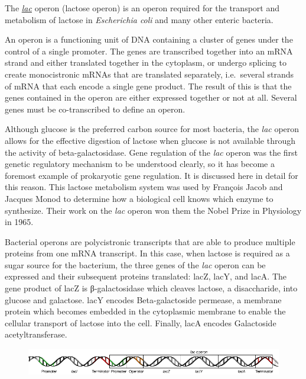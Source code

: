 The \href{https://en.wikipedia.org/wiki/Lac_operon}{\emph{lac}} operon (lactose operon) is an operon required for the transport and metabolism of lactose in \emph{Escherichia coli} and many other enteric bacteria.

An operon is a functioning unit of DNA containing a cluster of genes under the control of a single promoter. The genes are transcribed together into an mRNA strand and either translated together in the cytoplasm, or undergo splicing to create monocistronic mRNAs that are translated separately, i.e.~several strands of mRNA that each encode a single gene product. The result of this is that the genes contained in the operon are either expressed together or not at all. Several genes must be co-transcribed to define an operon.

Although glucose is the preferred carbon source for most bacteria, the \emph{lac} operon allows for the effective digestion of lactose when glucose is not available through the activity of beta-galactosidase. Gene regulation of the \emph{lac} operon was the first genetic regulatory mechanism to be understood clearly, so it has become a foremost example of prokaryotic gene regulation. It is discussed here in detail for this reason. This lactose metabolism system was used by François Jacob and Jacques Monod to determine how a biological cell knows which enzyme to synthesize. Their work on the \emph{lac} operon won them the Nobel Prize in Physiology in 1965.

Bacterial operons are polycistronic transcripts that are able to produce multiple proteins from one mRNA transcript. In this case, when lactose is required as a sugar source for the bacterium, the three genes of the \emph{lac} operon can be expressed and their subsequent proteins translated: lacZ, lacY, and lacA. The gene product of lacZ is β-galactosidase which cleaves lactose, a disaccharide, into glucose and galactose. lacY encodes Beta-galactoside permease, a membrane protein which becomes embedded in the cytoplasmic membrane to enable the cellular transport of lactose into the cell. Finally, lacA encodes Galactoside acetyltransferase.



\begin{figure}

{\centering \includegraphics[width=0.7\linewidth]{./figures/regulation/Lac_operon1} 

}

\caption{\href{https://commons.wikimedia.org/wiki/File:Lac_operon1.png}{}}\label{fig:lacoper}
\end{figure}

